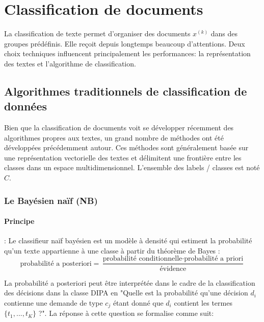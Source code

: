 \section{Classification de documents}
\label{sec:sensresultat:biblio_classif}

La classification de texte permet d'organiser des documents $x^{(k)}$ dans des groupes prédéfinis. Elle reçoit depuis longtemps beaucoup d'attentions. Deux choix techniques influencent principalement les performances: la représentation des textes et l'algorithme de classification. 

\subsection{Algorithmes traditionnels de classification de données}
Bien que la classification de documents voit se développer récemment des algorithmes propres aux textes, un grand nombre de méthodes ont été développées précédemment autour. Ces méthodes sont généralement basée sur une représentation vectorielle des textes et délimitent une frontière entre les classes dans un espace multidimensionnel. L'ensemble des labels / classes est noté $C$.

\subsubsection{Le Bayésien naïf (NB)}
\paragraph{Principe}:
Le classifieur naïf bayésien \citep{duda1973patternclass} est  un modèle à densité qui estiment la probabilité qu'un texte appartienne à une classe à partir du théorème de Bayes \citep{raschka2014naivebayes}:
\begin{equation}
\text{probabilité a posteriori} = \frac{\text{probabilité conditionnelle} \cdot \text{probabilité a priori}}{\text{évidence}}
\end{equation}

La probabilité a posteriori peut être interprétée dans le cadre de la classification des décisions dans la classe DIPA en "Quelle est la probabilité qu'une décision $d_i$ contienne une demande de type $c_j$ étant donné que $d_i$ contient les termes $\lbrace t_1, ..., t_K \rbrace$ ?". La réponse à cette question se formalise comme suit:

